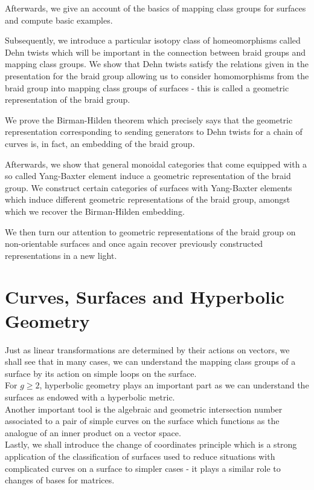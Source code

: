 \documentclass[reqno]{amsart}
\theoremstyle{definition}
\theoremstyle{remark}
\begin{document}
Afterwards, we give an account of the basics of
mapping class groups for surfaces and compute basic examples.

Subsequently, we introduce a particular isotopy class
of homeomorphisms called Dehn twists which will 
be important in the connection between braid groups and
mapping class groups. We show that
Dehn twists satisfy the relations given in the presentation
for the braid group allowing us to consider homomorphisms
from the braid group into mapping class groups of surfaces -
this is called a geometric representation of the braid group.

We prove the Birman-Hilden theorem which precisely says
that the geometric representation corresponding to
sending generators to Dehn twists for a chain of curves 
is, in fact, an embedding of the braid group. 

Afterwards, we show that
general monoidal categories that come equipped with a
so called Yang-Baxter element induce a geometric representation
of the braid group. We construct certain categories
of surfaces with Yang-Baxter elements which induce 
different geometric representations of the braid group, amongst
which we recover the Birman-Hilden embedding.

We then turn our attention to
geometric representations of the braid group on non-orientable
surfaces and once again recover previously constructed
representations in a new light. 

\section{Curves, Surfaces and Hyperbolic Geometry}


Just as linear transformations are determined by
their actions on vectors, we shall see
that in many cases, we can understand the mapping
class groups of a surface by its action on 
simple loops on the surface.\\

For $g \ge 2$, hyperbolic geometry plays an important part
as we can understand the surfaces as endowed with a
hyperbolic metric. \\

Another important tool is the algebraic and geometric intersection
number associated to a pair of simple curves on the surface
which functions as the analogue of an inner product on a
vector space.\\

Lastly, we shall introduce the change of coordinates
principle which is a strong application of
the classification of surfaces used to
reduce situations with complicated curves on a surface
to simpler cases - it plays a similar role to changes
of bases for matrices.
\end{document}
